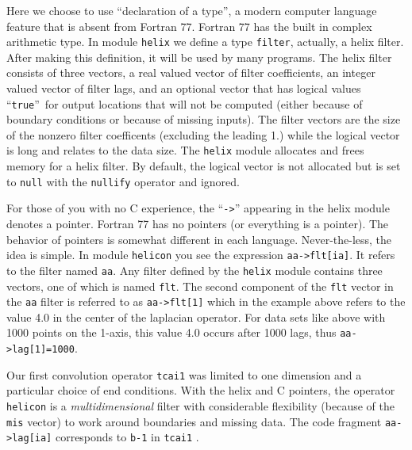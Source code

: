 \par
Here we choose to use
``declaration of a type'',
a modern computer language feature that is absent from Fortran 77.
Fortran 77 has the built in complex arithmetic type.
In module \texttt{helix}
we define a type \texttt{filter}, actually, a helix filter.
After making this definition, it will be used by many programs.
The helix filter consists of three vectors,
a real valued vector of filter coefficients,
an integer valued vector of filter lags,
and an optional vector
that has logical values ``\texttt{true}''~for
output locations that will not be computed
(either because of boundary conditions or because of missing inputs).
The filter vectors are the size of the nonzero filter coefficents
(excluding the leading 1.) while the logical vector is long
and relates to the data size.
The \texttt{helix} module allocates and frees memory for a helix filter.
By default, the logical vector is not allocated but
is set to \texttt{null}
with the \texttt{nullify} operator and ignored.
\par
For those of you with no C  experience,
the ``\verb#->#'' appearing in the helix module denotes a pointer.
Fortran 77 has no pointers (or everything is a pointer).
The behavior of pointers is somewhat different in each language.
Never-the-less, the idea is simple.
In module \texttt{helicon} %
you see the expression
\verb#aa->flt[ia]#.
It refers to the filter named \texttt{aa}.
Any filter defined by the \texttt{helix} module
contains three vectors, one of which is named \texttt{flt}.
The second component of the \texttt{flt} vector
in the \texttt{aa} filter
is referred to as
\verb#aa->flt[1]# which
in the example above refers to the value 4.0
in the center of the laplacian operator.
For data sets like above with 1000 points on the 1-axis,
this value 4.0 occurs after 1000 lags,
thus \verb#aa->lag[1]=1000#.

\par
Our first convolution operator
\texttt{tcai1}
was limited to one dimension and a particular choice of end conditions.
With the helix and C pointers,
the operator
\texttt{helicon} %
is a {\it multidimensional} filter
with considerable flexibility (because of the \texttt{mis} vector)
to work around boundaries and missing data.
The code fragment
\verb#aa->lag[ia]#
corresponds to 
\texttt{b-1}
in \texttt{tcai1} .


